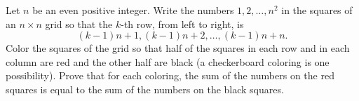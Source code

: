 Let $n$ be an even positive integer.  Write the numbers
$1,2,\ldots,n^2$ in the squares of an $n\times n$ grid so that the
$k$-th row, from left to right, is
\[(k-1)n+1,(k-1)n+2,\ldots, (k-1)n+n.\]
Color the squares of the grid so that half of the squares in each
row and in each column are red and the other half are black (a
checkerboard coloring is one possibility).  Prove that for each
coloring, the sum of the numbers on the red squares is equal to
the sum of the numbers on the black squares.
